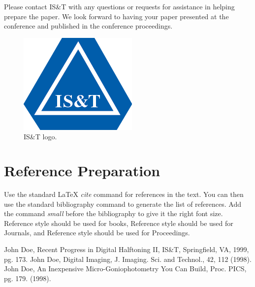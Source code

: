 \documentclass[letterpaper,twocolumn,fleqn]{article}
\begin{document}
Please contact IS\&T with any questions or requests for assistance in
helping prepare the paper. We look forward to having your paper
presented at the conference and published in the conference
proceedings.

\begin{figure}[!hb]
  \includegraphics[width=0.3\columnwidth]{logo.png}
  \caption{IS\&T logo.}
  \label{Figure:logo}
\end{figure}


\section{Reference Preparation}
Use the standard LaTeX \emph{cite} command for references in the
text. You can then use the standard bibliography command to generate
the list of references. Add the command \emph{small} before the
bibliography to give it the right font size.  Reference \cite{bib1}
style should be used for books, Reference \cite{bib2} style should be
used for Journals, and Reference \cite{bib3} style should be used for
Proceedings.




\small
\begin{thebibliography}{9}
John Doe, Recent Progress in Digital Halftoning II,
  IS\&T, Springfield, VA, 1999, pg. 173.
John Doe, Digital Imaging, J. Imaging. Sci. and
  Technol., 42, 112 (1998).
John Doe, An Inexpensive Micro-Goniophotometry You Can
  Build, Proc. PICS, pg. 179. (1998).
\end{thebibliography}
\end{document}

